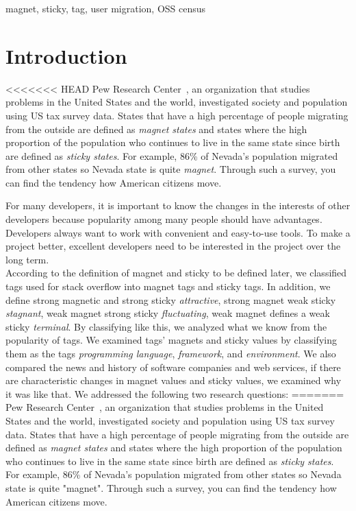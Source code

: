 \documentclass[conference]{IEEEtran}
\begin{document}
\begin{IEEEkeywords}
magnet, sticky, tag, user migration, OSS census
\end{IEEEkeywords}

\section{Introduction}
<<<<<<< HEAD
Pew Research Center~\cite{communityeconomic}, an organization that studies problems in the United States and the world, investigated society and population using US tax survey data.  States that have a high percentage of people migrating from the outside are defined as \emph{magnet states} and states where the high proportion of the population who continues to live in the same state since birth are defined as \emph{sticky states}. For example, 86\% of Nevada's population migrated from other states so Nevada state is quite \emph{magnet}. Through such a survey, you can find the tendency how American citizens move.

\smallskip
For many developers, it is important to know the changes in the interests of other developers because popularity among many people should have advantages. Developers always want to work with convenient and easy-to-use tools. To make a project better, excellent developers need to be interested in the project over the long term.\\

According to the definition of magnet and sticky to be defined later, we classified tags used for stack overflow into magnet tags and sticky tags. In addition, we define strong magnetic and strong sticky \emph{attractive}, strong magnet weak sticky \emph{stagnant}, weak magnet strong sticky \emph{fluctuating}, weak magnet defines a weak sticky \emph{terminal}. By classifying like this, we analyzed what we know from the popularity of tags. We examined tags' magnets and sticky values by classifying them as the tags \emph{programming language}, \emph{framework}, and \emph{environment}. We also compared the news and history of software companies and web services, if there are characteristic changes in magnet values and sticky values, we examined why it was like that. We addressed the following two research questions:
=======
Pew Research Center~\cite{communityeconomic}, an organization that studies problems in the United States and the world, investigated society and population using US tax survey data.  States that have a high percentage of people migrating from the outside are defined as \emph{magnet states} and states where the high proportion of the population who continues to live in the same state since birth are defined as \emph{sticky states}. For example, 86\% of Nevada's population migrated from other states so Nevada state is quite "magnet". Through such a survey, you can find the tendency how American citizens move.
\end{document}
